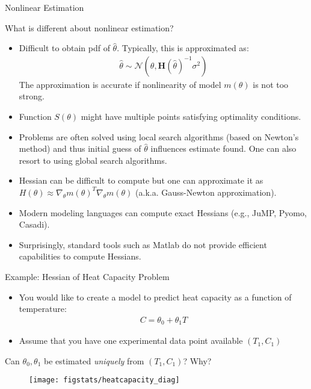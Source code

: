 \documentclass[handout,9pt]{beamer}
\begin{document}
%
\begin{frame}{Nonlinear Estimation}

What is different about nonlinear estimation?
\begin{itemize}
\setlength{\itemsep}{10pt}
\item  Difficult to obtain pdf of $\hat{\theta}$. Typically, this is approximated as:
\begin{align*}
\hat{\theta}\sim\mathcal{N}(\theta,\mathbf{H}(\hat{\theta})^{-1}\sigma^2)
\end{align*}
The approximation is accurate if nonlinearity of model $m(\theta)$ is not too strong. 
\item Function $S(\theta)$ might have multiple points satisfying optimality conditions.  
\item Problems are often solved using local search algorithms (based on Newton's method) and thus initial guess of $\hat{\theta}$ influences estimate found.  One can also resort to using global search algorithms. 
\item Hessian can be difficult to compute but one can approximate it as $H(\theta)\approx \nabla_\theta m(\theta)^T\nabla_\theta m(\theta)$ (a.k.a. Gauss-Newton approximation).
\item Modern modeling languages can compute exact Hessians (e.g., JuMP, Pyomo, Casadi). 
\item Surprisingly, standard tools such as Matlab do not provide efficient capabilities to compute Hessians. 
\end{itemize}
\end{frame}

%
\begin{frame}{Example: Hessian of Heat Capacity Problem}

\begin{itemize}
\item You would like to create a model to predict heat capacity as a function of temperature:
\begin{align*}
C=\theta_0+\theta_1 T
\end{align*}
\item Assume that you have one experimental data point available $(T_1,C_1)$
\end{itemize}
\begin{block}{}
\begin{center}
Can $\theta_0,\theta_1$ be estimated {\em uniquely} from $(T_1,C_1)$? Why? 
\end{center}
\end{block}
\pause
\begin{figure}[!htb]
    \centering
	\texttt{[image: figstats/heatcapacity\_diag]}
\end{figure}

\end{frame}
\end{document}
